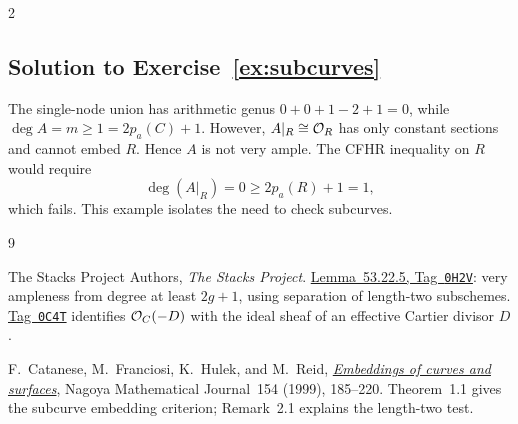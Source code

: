 \documentclass[12pt]{memoir}
\newcommand{\RRtag}[1]{\href{https://stacks.math.columbia.edu/tag/#1}{Tag~\texttt{#1}}}
\newcommand{\RRsolution}[1]{\subsection*{Solution to Exercise~\ref{#1}}\label{sol:#1}}
\begin{document}
\begin{multicols}{2}
\RRsolution{ex:subcurves}
The single-node union has arithmetic genus
$0+0+1-2+1=0$, while $\deg A=m\ge1=2p_a(C)+1$.
However, $A|_R\cong\mathcal{O}_R$ has only constant sections and cannot
embed $R$. Hence $A$ is not very ample. The CFHR inequality on
$R$ would require
\[
 \deg(A|_R)=0\ge2p_a(R)+1=1,
\]
which fails. This example isolates the need to check subcurves.

\begin{thebibliography}{9}
\raggedright
{}
The Stacks Project Authors, \emph{The Stacks Project}.
\href{https://stacks.math.columbia.edu/tag/0H2V}{Lemma~53.22.5,
Tag~\texttt{0H2V}}: very ampleness from degree at least $2g+1$,
using separation of length-two subschemes.
\RRtag{0C4T} identifies $\mathcal{O}_C(-D)$ with the ideal sheaf of an
effective Cartier divisor $D$.

F.~Catanese, M.~Franciosi, K.~Hulek, and M.~Reid,
\href{https://doi.org/10.1017/S0027763000025381}{\emph{Embeddings of
curves and surfaces}}, Nagoya Mathematical Journal~154 (1999),
185--220. Theorem~1.1 gives the subcurve embedding criterion;
Remark~2.1 explains the length-two test.
\end{thebibliography}

\end{multicols}
\end{document}
